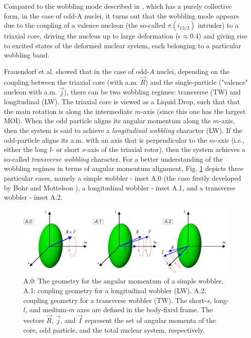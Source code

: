 \documentclass[myclassdoc,debug]{rjparticle}
\begin{document}
Compared to the wobbling mode described in \cite{bohr1998nuclear}, which has a purely collective form, in the case of odd-A nuclei, it turns out that the wobbling mode appears due to the coupling of a valence nucleon (the so-called $\pi(i_{13/2})$ intruder) to a triaxial core, driving the nucleus up to large deformation ($\epsilon\approx0.4$) \cite{schnack1995superdeformed} and giving rise to excited states of the deformed nuclear system, each belonging to a particular wobbling band.

Frauendorf et al. \cite{frauendorf2014transverse} showed that in the case of odd-$A$ nuclei, depending on the coupling between the triaxial core (with a.m. $\vec{R}$) and the single-particle ("valence" nucleon with a.m. $\vec{j}$), there can be two wobbling regimes: transverse (TW) and longitudinal (LW). The triaxial core is viewed as a Liquid Drop, such that that the main rotation is along the intermediate $m$-axis (since this one has the largest MOI). When the odd particle aligns its angular momentum along the $m$-axis, then the system is said to achieve a \emph{longitudinal wobbling} character (LW). If the odd-particle aligns its a.m. with an axis that is perpendicular to the $m$-axis (i.e., either the long $l$- or short $s$-axis of the triaxial rotor), then the system achieves a so-called \emph{transverse wobbling} character. For a better understanding of the wobbling regimes in terms of angular momentum alignment, Fig. \ref{wobbling-coupling-scheme} depicts three particular cases, namely a simple wobbler - inset A.0 (the case firstly developed by Bohr and Mottelson \cite{bohr1998nuclear}), a longitudinal wobbler - inset A.1, and a transverse wobbler - inset A.2.
\begin{figure}
    \centering
    \includegraphics[scale=0.5]{figs/wobbling_Regimes_COUPLING_SCHEME.pdf}
    \caption{A.0: The geometry for the angular momentum of a simple wobbler. A.1: coupling geometry for a longitudinal wobbler (LW). A.2: coupling geometry for a transverse wobbler (TW). The short-$s$, long-$l$, and medium-$m$ axes are defined in the body-fixed frame. The vectors $\vec{R}$, $\vec{j}$, and $\vec{I}$ represent the set of angular momenta of the core, odd particle, and the total nuclear system, respectively.}
    \label{wobbling-coupling-scheme}
\end{figure}
\end{document}
